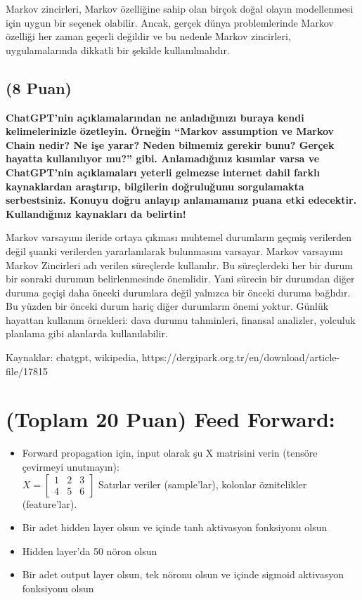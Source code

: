 \documentclass[11pt]{article}
\begin{document}
Markov zincirleri, Markov özelliğine sahip olan birçok doğal olayın modellenmesi için uygun bir seçenek olabilir. Ancak, gerçek dünya problemlerinde Markov özelliği her zaman geçerli değildir ve bu nedenle Markov zincirleri, uygulamalarında dikkatli bir şekilde kullanılmalıdır.

\subsection{(8 Puan)} \textbf{ChatGPT’nin açıklamalarından ne anladığınızı buraya kendi kelimelerinizle özetleyin. Örneğin ``Markov assumption ve Markov Chain nedir? Ne işe yarar? Neden bilmemiz gerekir bunu? Gerçek hayatta kullanılıyor mu?'' gibi. Anlamadığınız kısımlar varsa ve ChatGPT’nin açıklamaları yeterli gelmezse internet dahil farklı kaynaklardan araştırıp, bilgilerin doğruluğunu sorgulamakta serbestsiniz. Konuyu doğru anlayıp anlamamanız puana etki edecektir. Kullandığınız kaynakları da belirtin!}

Markov varsayımı ileride ortaya çıkması muhtemel durumların geçmiş verilerden değil şuanki verilerden yararlanılarak bulunmasını varsayar. Markov varsayımı Markov Zincirleri adı verilen süreçlerde kullanılır. Bu süreçlerdeki her bir durum bir sonraki durumun belirlenmesinde önemlidir. Yani sürecin bir durumdan diğer duruma geçişi daha önceki durumlara değil yalnızca bir önceki duruma bağlıdır. Bu yüzden bir önceki durum hariç diğer durumların önemi yoktur.
Günlük hayattan kullanım örnekleri: dava durumu tahminleri, finansal analizler, yolculuk planlama gibi alanlarda kullanılabilir. 

Kaynaklar: chatgpt, wikipedia, https://dergipark.org.tr/en/download/article-file/17815

\section{(Toplam 20 Puan) Feed Forward:}
 
\begin{itemize}
    \item Forward propagation için, input olarak şu X matrisini verin (tensöre çevirmeyi unutmayın):\\
    $X = \begin{bmatrix}
        1 & 2 & 3\\
        4 & 5 & 6
        \end{bmatrix}$
    Satırlar veriler (sample'lar), kolonlar öznitelikler (feature'lar).
    \item Bir adet hidden layer olsun ve içinde tanh aktivasyon fonksiyonu olsun
    \item Hidden layer'da 50 nöron olsun
    \item Bir adet output layer olsun, tek nöronu olsun ve içinde sigmoid aktivasyon fonksiyonu olsun
\end{itemize}
\end{document}
